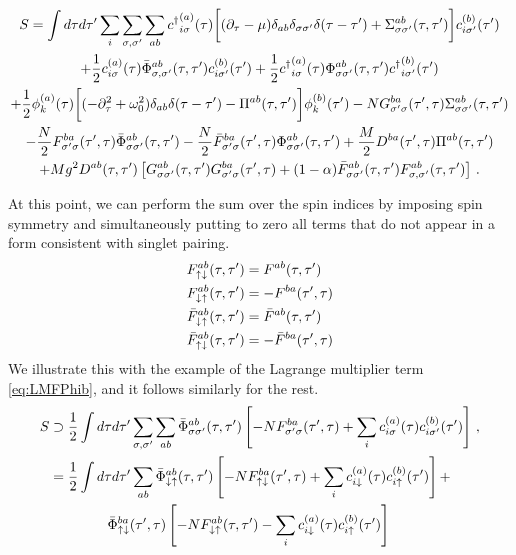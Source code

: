 \begin{widetext}
\begin{multline}
    S = \int d\tau d\tau^\prime \sum_i \sum_{\sigma,\sigma^\prime} \sum_{ab} {c^\dagger}^{(a)}_{i\sigma}(\tau)\bigg[(\partial_\tau - \mu)\delta_{ab}\delta_{\sigma\sigma^\prime}\delta(\tau-\tau^\prime) + \Sigma^{ab}_{\sigma\sigma^\prime}(\tau,\tau^\prime)\bigg]c^{(b)}_{i\sigma^\prime}(\tau^\prime) \\ + \frac{1}{2}c^{(a)}_{i\sigma}(\tau)\bar{\Phi}^{ab}_{\sigma,\sigma^\prime}(\tau,\tau^\prime)c^{(b)}_{i\sigma^\prime}(\tau^\prime) + \frac{1}{2}{c^\dagger}^{(a)}_{i\sigma}(\tau)\Phi^{ab}_{\sigma\sigma^\prime}(\tau,\tau^\prime){c^\dagger}^{(b)}_{i\sigma^\prime}(\tau^\prime)  \\ + \frac{1}{2}\phi^{(a)}_k(\tau)\bigg[(-\partial_\tau^2 + \omega_0^2)\delta_{ab}\delta(\tau-\tau^\prime) - \Pi^{ab}(\tau,\tau^\prime)\bigg]\phi^{(b)}_k(\tau^\prime) - NG^{ba}_{\sigma^\prime\sigma}(\tau^\prime,\tau)\Sigma^{ab}_{\sigma\sigma^\prime}(\tau,\tau^\prime)\\ - \frac{N}{2}F^{ba}_{\sigma^\prime\sigma}(\tau^\prime,\tau){\bar{\Phi}}^{ab}_{\sigma\sigma^\prime}(\tau,\tau^\prime) - \frac{N}{2}{\bar{F}}^{ba}_{\sigma^\prime\sigma}(\tau^\prime,\tau){\Phi}^{ab}_{\sigma\sigma^\prime}(\tau,\tau^\prime) + \frac{M}{2}D^{ba}(\tau^\prime,\tau)\Pi^{ab}(\tau,\tau^\prime) \\ +M g^2 D^{ab}(\tau,\tau^\prime)\left[G^{ab}_{\sigma\sigma^\prime}(\tau,\tau^\prime)G^{ba}_{\sigma^\prime\sigma}(\tau^\prime,\tau) + (1-\alpha)\Bar{F}^{ab}_{\sigma\sigma^\prime}(\tau,\tau^\prime)F^{ab}_{\sigma,\sigma^\prime}(\tau,\tau^\prime)\right]\,.
    \label{eq:actionbeforeintegrating}
\end{multline}
\end{widetext}
%
At this point, we can perform the sum over the spin indices by imposing spin symmetry and simultaneously putting to zero all terms that do not appear in a form consistent with singlet pairing. 
\begin{subequations}
\begin{align}
    F^{ab}_{\uparrow\downarrow}(\tau,\tau^\prime) &= F^{ab}(\tau,\tau^\prime) \\
    F^{ab}_{\downarrow\uparrow}(\tau,\tau^\prime) &= -F^{ba}(\tau^\prime,\tau) \\ 
    \bar{F}^{ab}_{\downarrow\uparrow}(\tau,\tau^\prime) &= \bar{F}^{ab}(\tau,\tau^\prime) \\
    \bar{F}^{ab}_{\uparrow\downarrow}(\tau,\tau^\prime) &= -\bar{F}^{ba}(\tau^\prime,\tau)
\end{align}
\label{eq:Fsinglet}
\end{subequations}
%
We illustrate this with the example of the Lagrange multiplier term \eqref{eq:LMFPhib}, and it follows similarly for the rest. 
\begin{align}
    S &\supset \frac{1}{2}\int d\tau d\tau^\prime \sum_{\sigma,\sigma^\prime}\sum_{ab}\bar{\Phi}^{ab}_{\sigma\sigma^\prime}(\tau,\tau^\prime)\left[-NF^{ba}_{\sigma^\prime\sigma}(\tau^\prime,\tau) + \sum_i c^{(a)}_{i\sigma}(\tau)c^{(b)}_{i\sigma^\prime}(\tau^\prime)\right] \, , \nonumber \\
    &= \frac{1}{2}\int d\tau d\tau^\prime \sum_{ab}\bar{\Phi}^{ab}_{\downarrow\uparrow}(\tau,\tau^\prime)\left[-N F^{ba}_{\uparrow\downarrow}(\tau^\prime,\tau) + \sum_ic^{(a)}_{i\downarrow}(\tau)c^{(b)}_{i\uparrow}(\tau^\prime)\right] + \nonumber \\ &\, \qquad\qquad \bar{\Phi}^{ba}_{\uparrow\downarrow}(\tau^\prime,\tau)\left[-NF^{ab}_{\downarrow\uparrow}(\tau,\tau^\prime) - \sum_ic^{(a)}_{i\downarrow}(\tau)c^{(b)}_{i\uparrow}(\tau^\prime)\right]
\end{align}
